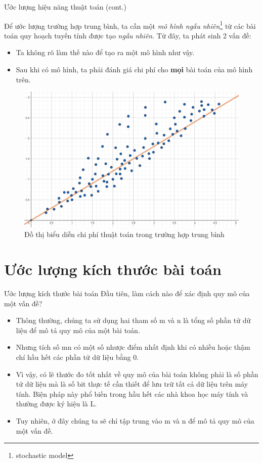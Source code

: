 \documentclass[10pt]{beamer}
\begin{document}
\begin{frame}{Ước lượng hiệu năng thuật toán (cont.)}
\begin{multicols}{2}
Để ước lượng  trường hợp trung bình, ta cần một \textit{mô hình ngẫu nhiên}\footnote{stochastic model} từ các bài toán quy hoạch tuyến tính được tạo \textit{ngẫu nhiên}. Từ đây, ta phát sinh 2 vấn đề:
\begin{itemize}
\item Ta không rõ làm thế nào để tạo ra một mô hình như vậy.
\item Sau khi có mô hình, ta phải đánh giá chi phí cho \textbf{mọi} bài toán của mô hình trên.
\end{itemize}
\columnbreak
\begin{figure}
\centering
\includegraphics[width=\linewidth]{img/average-case.png}
\caption{Đồ thị biểu diễn chi phí thuật toán trong trường hợp trung bình}
\end{figure}
\end{multicols}
\end{frame}

\section{Ước lượng kích thước bài toán}
\begin{frame}{Ước lượng kích thước bài toán}
Đầu tiên, làm cách nào để xác định quy mô của một vấn đề?
\begin{itemize}
\item Thông thường, chúng ta sử dụng hai tham số m và n là tổng số phần tử dữ liệu để mô tả quy mô của một bài toán. 
\item Nhưng tích số mn có một số nhược điểm nhất định khi có nhiều hoặc thậm chí hầu hết các phần tử dữ liệu bằng 0.
\item Vì vậy, có lẽ thước đo tốt nhất về quy mô của bài toán không phải là số phần tử dữ liệu mà là số bit thực tế cần thiết để lưu trữ tất cả dữ liệu trên máy tính. Biện pháp này phổ biến trong hầu hết các nhà khoa học máy tính và thường được ký hiệu là L.
\item Tuy nhiên, ở đây chúng ta sẽ chỉ tập trung vào m và n để mô tả quy mô của một vấn đề.
\end{itemize}
\end{frame}
\end{document}
